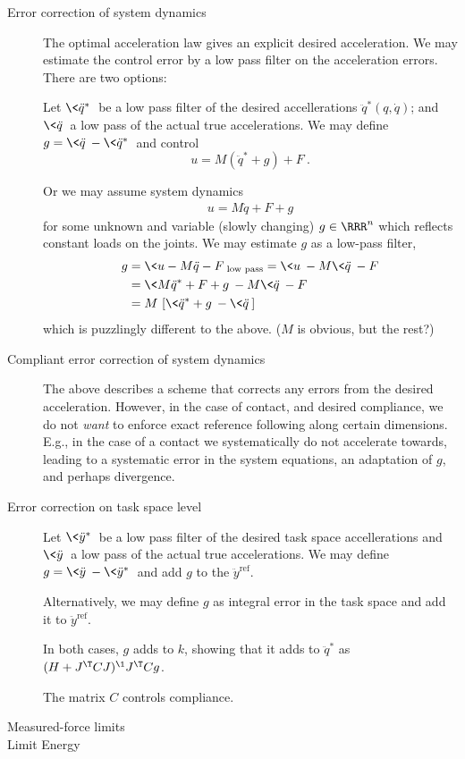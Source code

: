 \documentclass[10pt,fleqn,twoside]{article}
\newcommand{\rf}{{\text{ref}}}
\begin{document}
\begin{description}
\item[Error correction of system dynamics]

The optimal acceleration law gives an explicit desired
acceleration. We may estimate the control error by a low pass filter
on the acceleration errors. There are two options:

Let $\<\ddot q^*\>$ be a low pass filter of the desired accellerations
$\ddot q^*(q,\dot q)$; and $\<\ddot q\>$ a low pass of the actual true
accelerations. We may define $g = \<\ddot q\> - \<\ddot q^*\>$ and
control
$$u=M (\ddot q^* + g) + F ~.$$

Or we may assume system dynamics
\begin{align}
u=M \ddot q + F + g
\end{align}
for some unknown and variable (slowly changing) $g\in\RRR^n$ which
reflects constant loads on the joints. We may estimate $g$ as a
low-pass filter,
\begin{align}
g
&= \< u - M \ddot q - F \>_\text{low pass}
 = \< u \> - M \<\ddot q\> - F \\
&= \<M \ddot q^* + F + g\> - M \<\ddot q\> - F \\
&= M~ [ \< \ddot q^* + g\> - \<\ddot q\>]
\end{align}
which is puzzlingly different to the above. ($M$ is obvious, but the rest?)

\item[Compliant error correction of system dynamics]

The above describes a scheme that corrects any errors from the desired
acceleration. However, in the case of contact, and desired compliance,
we do not \emph{want} to enforce exact reference following along
certain dimensions. E.g., in the case of a contact we systematically
do not accelerate towards, leading to a systematic error in the system
equations, an adaptation of $g$, and perhaps divergence.

\item[Error correction on task space level]

Let $\<\ddot y^*\>$ be a low pass filter of the desired task space
accellerations and $\<\ddot y\>$ a low pass of the actual true
accelerations. We may define $g=\<\ddot y\> - \<\ddot y^*\>$ and add
$g$ to the $\ddot y^\rf$.

Alternatively, we may define $g$ as integral error in the task space
and add it to $\ddot y^\rf$.

In both cases, $g$ adds to $k$, showing that it adds to $\ddot q^*$
as $(H + J^\T C J)^\1 J^\T C g$.

The matrix $C$ controls compliance.



\item[Measured-force limits]

\item[Limit Energy]

\end{description}
\end{document}
